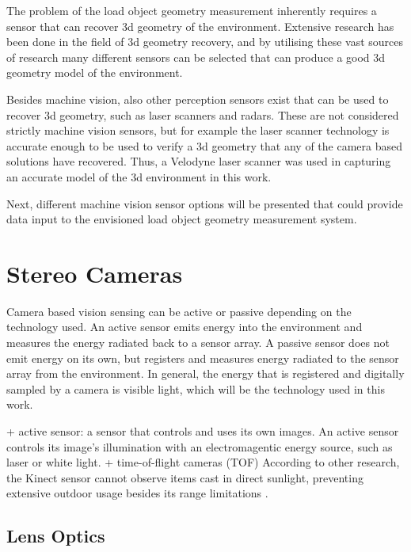 \documentclass[12pt,a4paper,oneside,pdftex]{report}
\begin{document}
The problem of the load object geometry measurement inherently requires a sensor that can recover 3d geometry of the environment. Extensive research has been done in the field of 3d geometry recovery, and by utilising these vast sources of research many different sensors can be selected that can produce a good 3d geometry model of the environment.

Besides machine vision, also other perception sensors exist that can be used to recover 3d geometry, such as laser scanners and radars. These are not considered strictly machine vision sensors, but for example the laser scanner technology is accurate enough to be used to verify a 3d geometry that any of the camera based solutions have recovered\citep{You11}. Thus, a Velodyne laser scanner was used in capturing an accurate model of the 3d environment in this work.

Next, different machine vision sensor options will be presented that could provide data input to the envisioned load object geometry measurement system.

\section{Stereo Cameras}
\label{section:stereo_cameras}

Camera based vision sensing can be active or passive depending on the technology used. An active sensor emits energy into the environment and measures the energy radiated back to a sensor array. A passive sensor does not emit energy on its own, but registers and measures energy radiated to the sensor array from the environment. In general, the energy that is registered and digitally sampled by a camera is visible light, which will be the technology used in this work.



+ active sensor: a sensor that controls and uses its own images. An active sensor controls its image's illumination with an electromagentic energy source, such as laser or white light.
+ time-of-flight cameras (TOF)
According to other research, the Kinect sensor cannot observe items cast in direct sunlight, preventing extensive outdoor usage besides its range limitations \cite{tikkanen13}.  

\subsection{Lens Optics}
\label{subsection:lens_optics}

\end{document}
